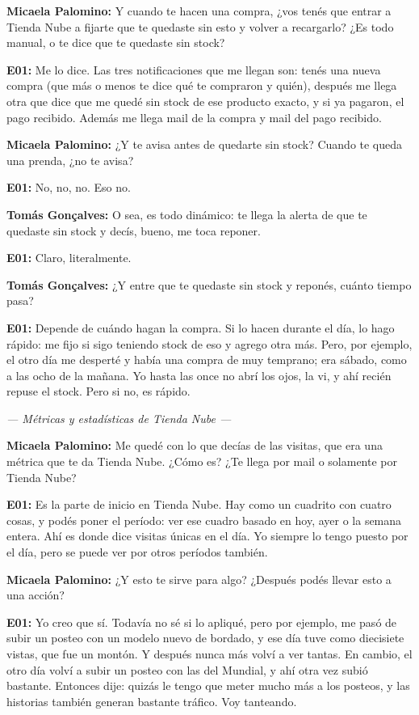 \noindent\textbf{Micaela Palomino:} Y cuando te hacen una compra, ¿vos tenés que entrar a Tienda Nube a fijarte que te quedaste sin esto y volver a recargarlo? ¿Es todo manual, o te dice que te quedaste sin stock?

\noindent\textbf{E01:} Me lo dice. Las tres notificaciones que me llegan son: tenés una nueva compra (que más o menos te dice qué te compraron y quién), después me llega otra que dice que me quedé sin stock de ese producto exacto, y si ya pagaron, el pago recibido. Además me llega mail de la compra y mail del pago recibido.

\noindent\textbf{Micaela Palomino:} ¿Y te avisa antes de quedarte sin stock? Cuando te queda una prenda, ¿no te avisa?

\noindent\textbf{E01:} No, no, no. Eso no.

\noindent\textbf{Tomás Gonçalves:} O sea, es todo dinámico: te llega la alerta de que te quedaste sin stock y decís, bueno, me toca reponer.

\noindent\textbf{E01:} Claro, literalmente.

\noindent\textbf{Tomás Gonçalves:} ¿Y entre que te quedaste sin stock y reponés, cuánto tiempo pasa?

\noindent\textbf{E01:} Depende de cuándo hagan la compra. Si lo hacen durante el día, lo hago rápido: me fijo si sigo teniendo stock de eso y agrego otra más. Pero, por ejemplo, el otro día me desperté y había una compra de muy temprano; era sábado, como a las ocho de la mañana. Yo hasta las once no abrí los ojos, la vi, y ahí recién repuse el stock. Pero si no, es rápido.

\noindent\textit{--- Métricas y estadísticas de Tienda Nube ---}

\noindent\textbf{Micaela Palomino:} Me quedé con lo que decías de las visitas, que era una métrica que te da Tienda Nube. ¿Cómo es? ¿Te llega por mail o solamente por Tienda Nube?

\noindent\textbf{E01:} Es la parte de inicio en Tienda Nube. Hay como un cuadrito con cuatro cosas, y podés poner el período: ver ese cuadro basado en hoy, ayer o la semana entera. Ahí es donde dice visitas únicas en el día. Yo siempre lo tengo puesto por el día, pero se puede ver por otros períodos también.

\noindent\textbf{Micaela Palomino:} ¿Y esto te sirve para algo? ¿Después podés llevar esto a una acción?

\noindent\textbf{E01:} Yo creo que sí. Todavía no sé si lo apliqué, pero por ejemplo, me pasó de subir un posteo con un modelo nuevo de bordado, y ese día tuve como diecisiete vistas, que fue un montón. Y después nunca más volví a ver tantas. En cambio, el otro día volví a subir un posteo con las del Mundial, y ahí otra vez subió bastante. Entonces dije: quizás le tengo que meter mucho más a los posteos, y las historias también generan bastante tráfico. Voy tanteando.

